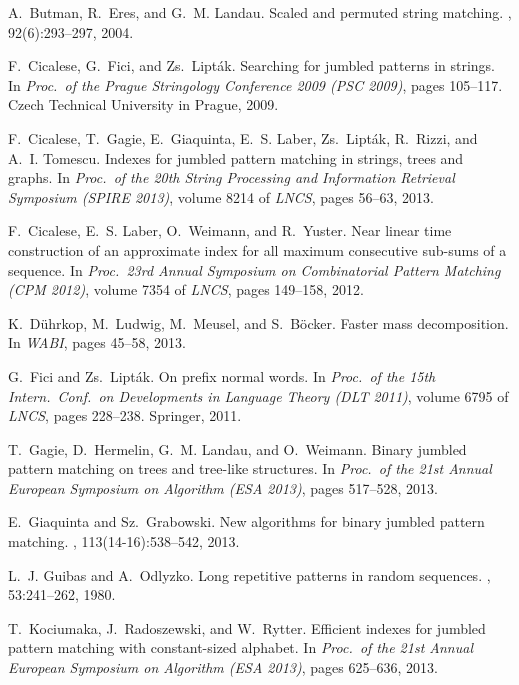 \documentclass[11pt,a4paper]{llncs}
\begin{document}
\begin{small}
\begin{thebibliography}{10}
A.~Butman, R.~Eres, and G.~M. Landau.
\newblock Scaled and permuted string matching.
, 92(6):293--297, 2004.

F.~Cicalese, G.~Fici, and {\relax Zs}.~Lipt{\'a}k.
\newblock Searching for jumbled patterns in strings.
\newblock In {\em Proc.\ of the Prague Stringology Conference 2009 (PSC 2009)},
  pages 105--117. Czech Technical University in Prague, 2009.

F.~Cicalese, T.~Gagie, E.~Giaquinta, E.~S. Laber, {\relax Zs}.~Lipt{\'a}k,
  R.~Rizzi, and A.~I. Tomescu.
\newblock Indexes for jumbled pattern matching in strings, trees and graphs.
\newblock In {\em Proc.\ of the 20th String Processing and Information
  Retrieval Symposium (SPIRE 2013)}, volume 8214 of {\em LNCS}, pages 56--63,
  2013.

F.~Cicalese, E.~S. Laber, O.~Weimann, and R.~Yuster.
\newblock Near linear time construction of an approximate index for all maximum
  consecutive sub-sums of a sequence.
\newblock In {\em Proc.\ 23rd Annual Symposium on Combinatorial Pattern
  Matching (CPM 2012)}, volume 7354 of {\em LNCS}, pages 149--158, 2012.

K.~D{\"u}hrkop, M.~Ludwig, M.~Meusel, and S.~B{\"o}cker.
\newblock Faster mass decomposition.
\newblock In {\em WABI}, pages 45--58, 2013.

G.~Fici and {\relax Zs}.~Lipt{\'a}k.
\newblock On prefix normal words.
\newblock In {\em Proc.\ of the 15th Intern.\ Conf.\ on Developments in
  Language Theory (DLT 2011)}, volume 6795 of {\em LNCS}, pages 228--238.
  Springer, 2011.

T.~Gagie, D.~Hermelin, G.~M. Landau, and O.~Weimann.
\newblock Binary jumbled pattern matching on trees and tree-like structures.
\newblock In {\em Proc.\ of the 21st Annual European Symposium on Algorithm
  (ESA 2013)}, pages 517--528, 2013.

E.~Giaquinta and {\relax Sz}.~Grabowski.
\newblock New algorithms for binary jumbled pattern matching.
, 113(14-16):538--542, 2013.

L.~J. Guibas and A.~Odlyzko.
\newblock Long repetitive patterns in random sequences.
, 53:241--262, 1980.

T.~Kociumaka, J.~Radoszewski, and W.~Rytter.
\newblock Efficient indexes for jumbled pattern matching with constant-sized
  alphabet.
\newblock In {\em Proc.\ of the 21st Annual European Symposium on Algorithm
  (ESA 2013)}, pages 625--636, 2013.


\end{thebibliography}
\end{small}
\end{document}
